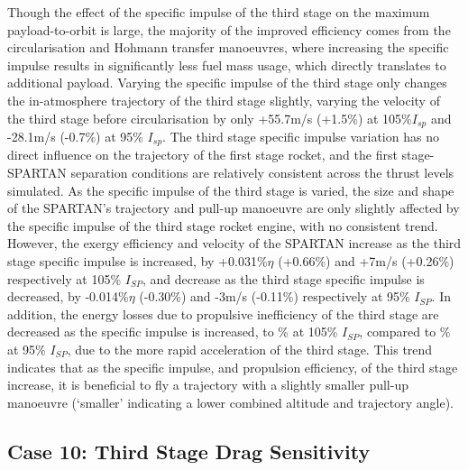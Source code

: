 Though the effect of the specific impulse of the third stage on the maximum payload-to-orbit is large, the majority of the improved efficiency comes from the circularisation and Hohmann transfer manoeuvres, where increasing the specific impulse results in significantly less fuel mass usage, which directly translates to additional payload. Varying the specific impulse of the third stage only changes the in-atmosphere trajectory of the third stage slightly, varying the velocity of the third stage before circularisation by only +55.7m/s (+1.5\%) at 105\%$I_{sp}$ and -28.1m/s (-0.7\%) at 95\% $I_{sp}$. 
The third stage specific impulse variation has no direct influence on the trajectory of the first stage rocket, and the first stage-SPARTAN separation conditions are relatively consistent across the thrust levels simulated.
As the specific impulse of the third stage is varied, the size and shape of the SPARTAN's trajectory and pull-up manoeuvre are only slightly affected by the specific impulse of the third stage rocket engine, with no consistent trend. 
 However, the exergy efficiency and velocity of the SPARTAN increase as the third stage specific impulse is increased, by +0.031\%$\eta$ (+0.66\%) and +7m/s (+0.26\%) respectively at 105\% $I_{SP}$, and decrease as the third stage specific impulse is decreased, by -0.014\%$\eta$ (-0.30\%) and -3m/s (-0.11\%) respectively at 95\% $I_{SP}$. 
 In addition, the energy losses due to propulsive inefficiency of the third stage are decreased as the specific impulse is increased, to \PlossthreeCombinedTThreeOneHundredTenNoReturn\% at 105\% $I_{SP}$, compared to \PlossthreeCombinedTThreeNinetyNoReturn\% at 95\% $I_{SP}$, due to the more rapid acceleration of the third stage.
 This trend indicates that as the specific impulse, and propulsion efficiency, of the third stage increase, it is beneficial to fly a trajectory with a slightly smaller pull-up manoeuvre (`smaller' indicating a lower combined altitude and trajectory angle).



\subsection{Case 10: Third Stage Drag Sensitivity}

